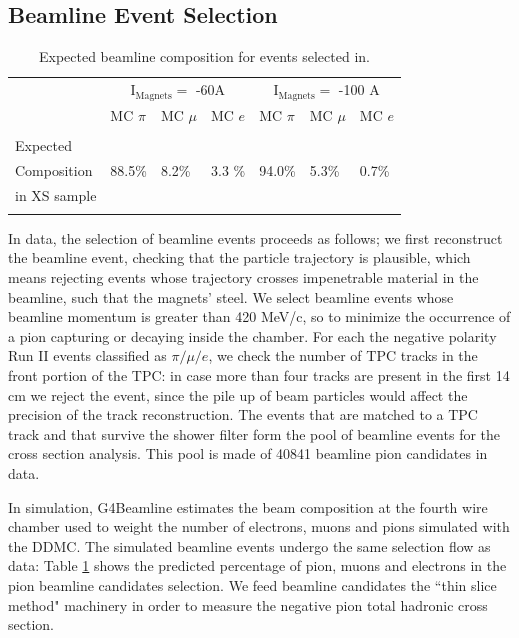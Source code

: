 \documentclass[aps,prl,twocolumn,showpacs,superscriptaddress,groupedaddress]{revtex4}  %
\begin{document}
\subsection{\label{sec:EventSelection}Beamline Event Selection}
\begin{table}
\caption{\label{tab:MCafterCutContaminants}Expected beamline composition for events selected in.}
\begin{ruledtabular}
\begin{tabular}{ l | l | l | l | l | l | l  |}
 &  \multicolumn{3}{c|}{I$_{\text{Magnets}} =$ -60A} & \multicolumn{3}{c|}{I$_{\text{Magnets}} =$ -100 A }\\
& MC $\pi$   & MC  $ \mu$ & MC  $e$ & MC  $\pi$ & MC  $\mu$ & MC  $e$  \\
\hline
&  &  &  & & &\\  
Expected &  &  &  & & &\\  
Composition&  88.5\%   & 8.2\%   & 3.3 \%   & 94.0\%	& 5.3\% & 0.7\%\\
in XS sample               &                      &                       &                   &                       &                        &\\  
&                      &                       &                   &                       &                        &\\  
\end{tabular}
\end{ruledtabular}
\end{table}

In data, the selection of beamline events proceeds as follows; we first reconstruct the beamline event, checking that the particle trajectory is plausible, which means rejecting events whose trajectory crosses impenetrable material in the beamline, such that the magnets' steel. We select beamline events whose beamline momentum is greater than 420 MeV/c, so to minimize the occurrence of a pion capturing or decaying inside the chamber.  For each the negative polarity Run II events classified as $\pi/\mu/e$, we check the number of TPC tracks in the front portion of the TPC: in case more than four tracks are present in the first 14 cm we reject the event,  since the pile up of beam particles would affect the precision of the track reconstruction.
The events that are matched to a TPC track and that survive the shower filter form the pool of beamline events for the cross section analysis. This pool is made of 40841 beamline pion candidates in data. 

In simulation, G4Beamline estimates the beam composition at the fourth wire chamber used to weight the number of electrons, muons and pions simulated with the DDMC. The simulated beamline events undergo the same selection flow as data: Table \ref{tab:MCafterCutContaminants} shows the predicted percentage of pion, muons and electrons in the pion beamline candidates selection. We feed beamline candidates the ``thin slice method" machinery in order to measure the negative pion total hadronic cross section. 
\end{document}
